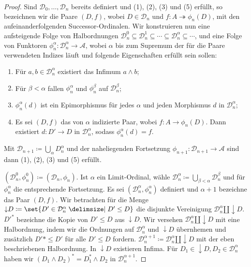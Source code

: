 \documentclass[a4paper, parskip=half]{scrartcl}
\theoremstyle{marginbreak}
\theoremstyle{nonumberplain}
\newtheorem{proof}{Beweis.}
\newcommand\cat\mathcal
\newcommand{\down}[1]{{\downarrow}#1}
\begin{document}
{\begin{proof}
			Sind $\cat{D}_0,\ldots,\cat{D}_n$ bereits definiert und (1), (2), (3)
			und (5) erfüllt, so bezeichnen wir die Paare $(D, f)$, wobei $D\in\cat{D}_n$
			und $f\colon A\twoheadrightarrow \phi_n(D)$, mit den aufeinanderfolgenden
			Successor-Ordinalen. Wir konstruieren nun eine aufsteigende Folge von
			Halbordnungen $\cat{D}_n^0\subseteq\cat{D}_n^1\subseteq\cdots\subseteq\cat{D}_n^\alpha\subseteq\cdots$,
			und eine Folge von Funktoren $\phi_n^\alpha\colon\cat{D}_n^\alpha\to\cat{A}$,
			wobei $\alpha$ bis zum Supremum der für die Paare verwendeten Indizes läuft und
			folgende Eigenschaften erfüllt sein sollen:
			\begin{enumerate}[label=(\alph*),noitemsep]
				\item Für $a, b\in\cat{D}_n^\alpha$ existiert das Infimum $a\wedge b$;
				\item Für $\beta<\alpha$ fallen $\phi_n^\alpha$ und $\phi_n^\beta$ auf $\cat{D}_n^\beta$;
				\item $\phi_n^\alpha(d)$ ist ein Epimorphismus für jedes $\alpha$ und jeden
					Morphismus $d$ in $\cat{D}_n^\alpha$;
				\item Es sei $(D, f)$ das von $\alpha$ indizierte Paar, wobei
					$f\colon A\to\phi_n(D)$. Dann existiert $d\colon D'\to D$ in
					$\cat{D}_n^\alpha$, sodass $\phi_n^\alpha(d) = f$.
			\end{enumerate}
			Mit $\cat{D}_{n+1}\coloneqq\bigcup_\alpha D_n^\alpha$ und der naheliegenden
			Fortsetzung $\phi_{n+1}\colon\cat{D}_{n+1}\to\cat{A}$ sind dann (1), (2), (3)
			und (5) erfüllt.

			$(\cat{D}_n^0, \phi_n^0)\coloneqq (\cat{D}_n, \phi_n)$. Ist $\alpha$ ein
			Limit-Ordinal, wähle $\cat{D}_n^\alpha\coloneqq\bigcup_{\beta<\alpha}\cat{D}_n^\beta$
			und für $\phi_n^\alpha$ die entsprechende Fortsetzung. Es sei $(\cat{D}_n^\alpha,
			\phi_n^\alpha)$ definiert und $\alpha+1$ bezeichne das Paar $(D, f)$.
			Wir betrachten für die Menge $\down{D}\coloneqq\set{D'\in\cat{D}_n^\alpha\given D'\leq D}$
			die disjunkte Vereinigung $\cat{D}_n^\alpha\amalg\down{D}$. $D'^*$
			bezeichne die Kopie von $D'\leq D$ aus $\down{D}$. Wir versehen
			$\cat{D}_n^\alpha\amalg\down{D}$ mit eine Halbordnung, indem wir die
			Ordnungen auf $\cat{D}_n^\alpha$ und $\down{D}$ übernhemen und zusätzlich
			$D'*\leq D'$ für alle $D'\leq D$ fordern. $\cat{D}_n^{\alpha+1}\coloneqq
			\cat{D}_n^\alpha\amalg\down{D}$ mit der eben beschriebenen Halbordnung.
			In $\down{D}$ existieren Infima. Für $D_1\in\down{D}, D_2\in\cat{D}_n^\alpha$
			haben wir $(D_1\wedge D_2)^*=D_1^*\wedge D_2$ in $\cat{D}_n^{\alpha+1}$.


\end{proof}}
\end{document}
